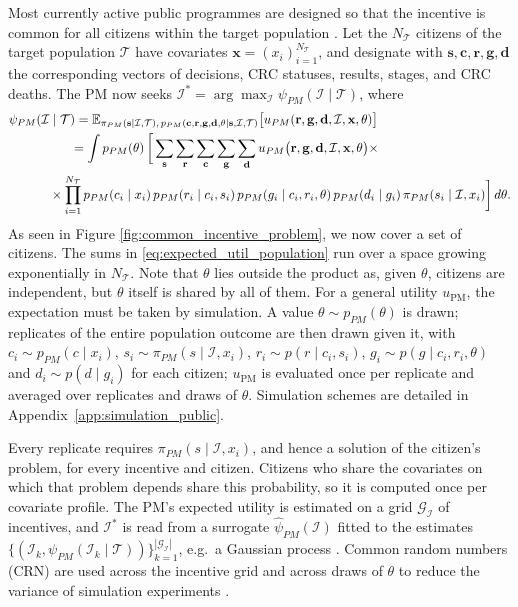 \documentclass[12pt]{article}
\begin{document}
Most currently active public programmes are designed so that the incentive is common for all citizens within the target population \citep{facciorusso2021addition}. Let the $N_{\mathcal{T}}$ citizens of the target population $\mathcal{T}$ have covariates $\mathbf{x} = (x_i)_{i=1}^{N_\mathcal{T}}$, and designate with $\mathbf{s}, \mathbf{c}, \mathbf{r}, \mathbf{g}, \mathbf{d}$ the corresponding vectors of decisions, CRC statuses, results, stages, and CRC deaths. The PM now seeks $\mathcal{I}^{*} = \arg \max_{\mathcal{I}} \psi_{PM}(\mathcal{I} \mid \mathcal{T})$, where
\begin{align}\label{eq:expected_util_population}
 \psi_{PM}&(\mathcal{I} \mid \mathcal{T})
  = \mathbb{E}_{\pi_{PM}(\mathbf{s} \mid \mathcal{I}, \mathcal{T}),\, p_{PM}(\mathbf{c}, \mathbf{r}, \mathbf{g}, \mathbf{d}, \theta \mid \mathbf{s}, \mathcal{I}, \mathcal{T})} \big[u_{PM}( \mathbf{r}, \mathbf{g}, \mathbf{d}, \mathcal{I}, \mathbf{x}, \theta)\big] \\
  & \qquad \ \ = \int   p_{PM}(\theta)\, \bigg[ \sum_{\mathbf{s}} \sum_{\mathbf{r}} \sum_{\mathbf{c}} \sum_{\mathbf{g}} \sum_{\mathbf{d}}
     u_{PM}\big( \mathbf{r}, \mathbf{g}, \mathbf{d}, \mathcal{I}, \mathbf{x}, \theta \big) \times \notag\\
  &\quad  \times
     \prod_{i=1}^{N_{\mathcal{T}}}
        p_{PM}(c_i\mid x_i)\, p_{PM}(r_i\mid c_i, s_i)\, p_{PM}(g_i \mid c_i, r_i, \theta)\, p_{PM}(d_i \mid g_i)\, \pi_{PM}(s_i\mid\mathcal{I}, x_i) \bigg]\, d\theta. \notag
\end{align}
As seen in Figure \ref{fig:common_incentive_problem}, we now cover a set of citizens. The sums in \eqref{eq:expected_util_population} run over a space growing exponentially in $N_{\mathcal{T}}$. Note that $\theta$ lies outside the product as, given $\theta$, citizens are independent, but $\theta$ itself is shared by all of them. For a general utility $u_{\text{PM}}$, the expectation must be taken by simulation. A value $\theta \sim p_{PM}(\theta)$ is drawn; replicates of the entire population outcome are then drawn given it, with $c_i \sim p_{PM}(c \mid x_i)$, $s_i \sim \pi_{PM}(s \mid \mathcal{I}, x_i)$, $r_i \sim p(r \mid c_i, s_i)$, $g_i \sim p(g \mid c_i, r_i, \theta)$ and $d_i \sim p(d \mid g_i)$ for each citizen; $u_{\text{PM}}$ is evaluated once per replicate and averaged over replicates and draws of $\theta$. Simulation schemes are detailed in Appendix~\ref{app:simulation_public}.

Every replicate requires $\pi_{PM}(s \mid \mathcal{I}, x_i)$, and hence a solution of the citizen's problem, for every incentive and citizen. Citizens who share the covariates on which that problem depends share this probability, so it is computed once per covariate profile. The PM's expected utility is estimated on a grid $\mathcal{G}_{\mathcal{I}}$ of incentives, and $\mathcal{I}^*$ is read from a surrogate $\widehat{\psi}_{PM}(\mathcal{I})$ fitted to the estimates $\{(\mathcal{I}_k, \psi_{PM}(\mathcal{I}_k \mid \mathcal{T}))\}_{k=1}^{|\mathcal{G}_{\mathcal{I}}|}$, e.g.\ a Gaussian process \citep{gramacy2020surrogates}. Common random numbers (CRN)  are used across the incentive grid and across draws of $\theta$ to reduce the variance of simulation experiments \citep{law1991simulation}.
\end{document}
